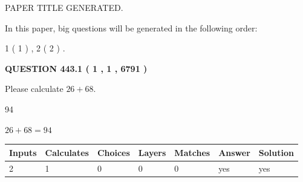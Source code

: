 \documentclass[12pt]{article}
\begin{document}
   
   
   
   
   
 \vspace{0.2in}
 
 
 
 
   
   
 PAPER TITLE GENERATED.
   
   
   
\vspace{0.2in}
   
In this paper, big questions will be generated in the following order: 
   
   
   1 ( 1 )
 ,
   2 ( 2 )
 .
  
\vspace{0.2in}
  
{\textbf{\Large{QUESTION
443.1 
 ( 1 , 1 , 6791 )
}}}
  
  
 
Please calculate $ %
26 +  %
68 $.
 
 
 
\noindent{}
 
 

94
 
 
\noindent{}
 
 

 
 
 
\noindent{}
 
 

$ %
26 +  %
68=   %
94$
 
 
\noindent{}
 
 

 
   
   
   
   
\noindent\begin{tabular}{|l|l|l|l|l|l|l|}
 \hline
Inputs & Calculates & Choices & Layers & Matches & Answer & Solution \\ \hline
 2  & 
 1  & 
 0
  & 
 0  & 
 0  & 
  yes & 
  yes 
  \\ \hline
 \end{tabular}
   
   
   
   
\noindent{}
   
\end{document}
